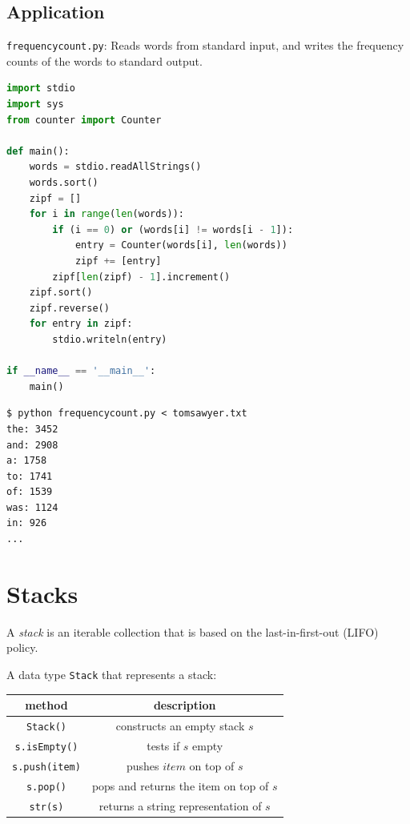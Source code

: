 \documentclass[8pt,a4paper,compress,handout]{beamer}
\begin{document}
\subsection*{Application}
\begin{frame}[fragile]
\begin{framed}
\tiny \lstinline{frequencycount.py}: Reads words from standard input, and writes the frequency counts of the words to standard output.
\end{framed}

\begin{lstlisting}[language=Python]
import stdio
import sys
from counter import Counter

def main():
    words = stdio.readAllStrings()
    words.sort()
    zipf = []
    for i in range(len(words)):
        if (i == 0) or (words[i] != words[i - 1]):
            entry = Counter(words[i], len(words))
            zipf += [entry]
        zipf[len(zipf) - 1].increment()
    zipf.sort()
    zipf.reverse()
    for entry in zipf:
        stdio.writeln(entry)

if __name__ == '__main__':
    main()
\end{lstlisting}

\begin{lstlisting}[language={}]
$ python frequencycount.py < tomsawyer.txt
the: 3452
and: 2908
a: 1758
to: 1741
of: 1539
was: 1124
in: 926
...
\end{lstlisting}
\end{frame}

\section{Stacks}
\begin{frame}[fragile]
A \emph{stack} is an iterable collection that is based on the last-in-first-out (LIFO) policy.

\bigskip

A data type \lstinline{Stack} that represents a stack:
\begin{center}
\begin{tabular}{cc}
method & description \\ \hline
\lstinline$Stack()$ & constructs an empty stack $s$ \\
\lstinline$s.isEmpty()$ & tests if $s$ empty \\
\lstinline$s.push(item)$ & pushes $item$ on top of $s$ \\
\lstinline$s.pop()$ &  pops and returns the item on top of $s$ \\
\lstinline$str(s)$ & returns a string representation of $s$
\end{tabular} 
\end{center}
\end{frame}
\end{document}
